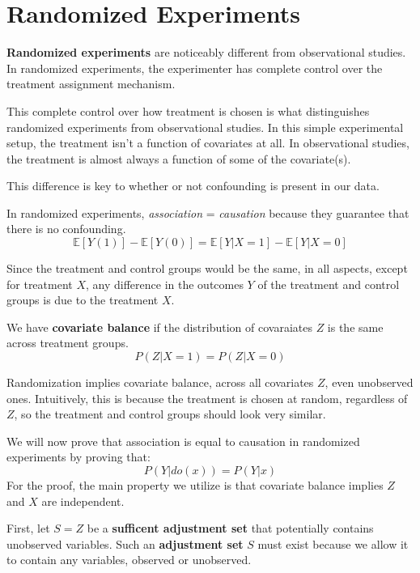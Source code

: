 \chapter{Randomized Experiments}
\textbf{Randomized experiments} are noticeably different from observational studies.
In randomized experiments, the experimenter has complete control over the treatment
assignment mechanism.

This complete control over how treatment is chosen is what distinguishes randomized experiments from observational studies. In this simple experimental setup, the treatment 
isn’t a function of covariates at all. In observational studies, the treatment is almost always a function of some of the covariate(s).

This difference is key to whether or not confounding is present in our data.

In randomized experiments, \textit{association} = \textit{causation} because they guarantee that there is no confounding.
\begin{equation}
    \mathbb{E}[Y(1)] -  \mathbb{E}[Y(0)] = \mathbb{E}[Y| X = 1] - \mathbb{E}[Y | X = 0]
\end{equation}

Since the treatment and control groups would be the same, in all aspects, except for treatment $X$, any difference in the outcomes $Y$ of the treatment and control groups is due to the treatment $X$.
\begin{definition}
    We have \textbf{covariate balance} if the distribution of covaraiates $Z$ is the same across treatment groups.
    \begin{equation}
        P(Z|X = 1) = P(Z|X = 0)
    \end{equation}
\end{definition}

Randomization implies covariate balance, across all covariates $Z$, even unobserved ones. Intuitively, this is because the treatment is chosen at random, regardless of $Z$, so the treatment and control groups should look very similar. 

We will now prove that association is equal to causation in randomized experiments by proving that:
\begin{equation*}
    P(Y|do(x)) = P(Y|x)
\end{equation*}
For the proof, the main property we utilize is that covariate balance implies $Z$ and $X$ are independent.

First, let $S = Z$ be a \textbf{sufficent adjustment set} that potentially contains unobserved variables. Such an \textbf{adjustment set} $S$ must exist because we allow it to contain any variables, observed or unobserved. 

